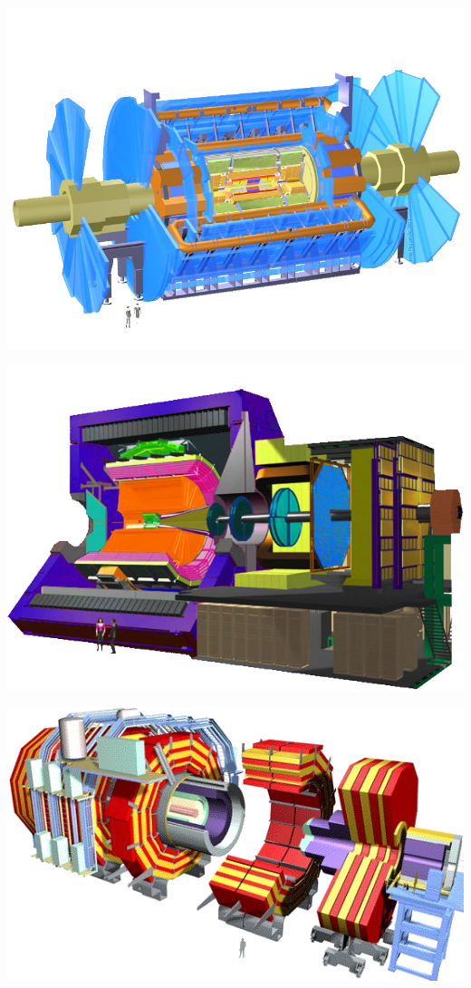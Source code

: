 \marginpar
{
	\includegraphics[width=\marginparwidth]{LHC/atlas.png}
	\label{atlas}
}

\marginpar
{
	\includegraphics[width=\marginparwidth]{LHC/alice.png}
	\label{alice}
}

\marginpar
{
	\includegraphics[width=\marginparwidth]{LHC/cms.png}
	\label{cms}
}

